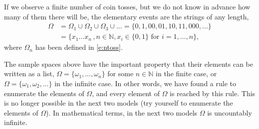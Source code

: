 \begin{model}
	\label{ex:finite_coin}
	If we observe a finite number of coin tosses, but we do not know in advance how many of them there will be, the elementary events are the strings of any length, 
	\begin{equation}
		\label{e:finite_coin}
		\begin{split}
			\Omega & = \Omega_1 \cup \Omega_2 \cup \Omega_3 \cup \ldots = \{0, 1, 00, 01, 10, 11, 000, \ldots\} \\
			& = \{x_1 \ldots x_n \,, n \in \mathbb N, x_i \in \{0,1\} \text{ for $i = 1, \ldots, n$}\}, 
		\end{split}
	\end{equation}
	where $\Omega_n$ has been defined in \eqref{e:ntoss}. 
\end{model}

\begin{remark}
	\label{r:uncountable}
	The sample spaces above have the important property that their elements can be written as a list, $\Omega = \{\omega_1, \ldots, \omega_n\}$ for some $n \in \mathbb N$ in the finite case, or $\Omega = \{\omega_1, \omega_2, \ldots\}$ in the infinite case. In other words, we have found a rule to enumerate the elements of $\Omega$, and every element of $\Omega$ is reached by this rule. This is no longer possible in the next two models (try yourself to enumerate the elements of $\Omega$). In mathematical terms, in the next two models $\Omega$ is uncountably infinite. 
\end{remark}

